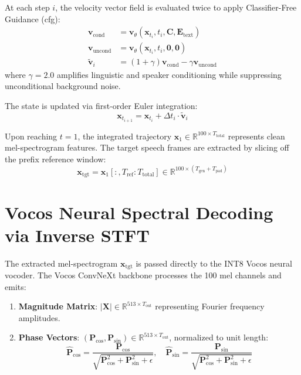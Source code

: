 At each step $i$, the velocity vector field is evaluated twice to apply Classifier-Free Guidance (\acrshort{cfg}):
\begin{align}
    \mathbf{v}_{\text{cond}} &= \mathbf{v}_\theta(\mathbf{x}_{t_i}, t_i, \mathbf{C}, \mathbf{E}_{\text{text}}) \label{eq:v_cond} \\
    \mathbf{v}_{\text{uncond}} &= \mathbf{v}_\theta(\mathbf{x}_{t_i}, t_i, \mathbf{0}, \mathbf{0}) \label{eq:v_uncond} \\
    \tilde{\mathbf{v}}_i &= (1 + \gamma)\mathbf{v}_{\text{cond}} - \gamma \mathbf{v}_{\text{uncond}} \label{eq:v_guided}
\end{align}
where $\gamma = 2.0$ amplifies linguistic and speaker conditioning while suppressing unconditional background noise.

The state is updated via first-order Euler integration:
\begin{equation}
    \mathbf{x}_{t_{i+1}} = \mathbf{x}_{t_i} + \Delta t_i \cdot \tilde{\mathbf{v}}_i
    \label{eq:euler_step}
\end{equation}

Upon reaching $t=1$, the integrated trajectory $\mathbf{x}_1 \in \mathbb{R}^{100 \times T_{\text{total}}}$ represents clean mel-spectrogram features. The target speech frames are extracted by slicing off the prefix reference window:
\begin{equation}
    \mathbf{x}_{\text{tgt}} = \mathbf{x}_1[:, T_{\text{ref}} : T_{\text{total}}] \in \mathbb{R}^{100 \times (T_{\text{gen}} + T_{\text{pad}})}
    \label{eq:slicing_operation}
\end{equation}

\section{Vocos Neural Spectral Decoding via Inverse STFT}
The extracted mel-spectrogram $\mathbf{x}_{\text{tgt}}$ is passed directly to the INT8 Vocos neural vocoder. The Vocos ConvNeXt backbone processes the 100 mel channels and emits:
\begin{enumerate}
    \item \textbf{Magnitude Matrix}: $|\mathbf{X}| \in \mathbb{R}^{513 \times T_{\text{out}}}$ representing Fourier frequency amplitudes.
    \item \textbf{Phase Vectors}: $(\mathbf{P}_{\text{cos}}, \mathbf{P}_{\text{sin}}) \in \mathbb{R}^{513 \times T_{\text{out}}}$, normalized to unit length:
    \begin{equation}
        \hat{\mathbf{P}}_{\text{cos}} = \frac{\mathbf{P}_{\text{cos}}}{\sqrt{\mathbf{P}_{\text{cos}}^2 + \mathbf{P}_{\text{sin}}^2 + \epsilon}}, \quad \hat{\mathbf{P}}_{\text{sin}} = \frac{\mathbf{P}_{\text{sin}}}{\sqrt{\mathbf{P}_{\text{cos}}^2 + \mathbf{P}_{\text{sin}}^2 + \epsilon}}
        \label{eq:phase_normalization}
    \end{equation}
\end{enumerate}

